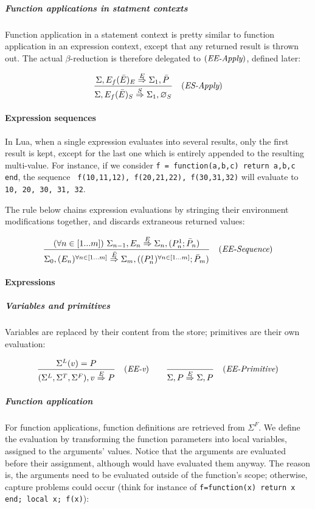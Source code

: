 \subparagraph{Function applications in statment contexts}
Function application in a statement context is pretty similar to
function application in an expression context, except that any
returned result is thrown out.  The actual
$\beta$-reduction is therefore delegated to $(\textit{EE-Apply})$,
defined later:

$$ \frac{
  \Sigma, E_f(\bar E)_E \stackrel{E}{\Rightarrow} \Sigma_1, \bar P\\
  }
  {\Sigma, E_f(\bar E)_S \stackrel{S}{\Rightarrow} \Sigma_1, \varnothing_S}
  \quad
  (\textit{ES-Apply})$$

\paragraph{Expression sequences}
In Lua, when a single expression evaluates into several results, only
the first result is kept, except for the last one which is entirely
appended to the resulting multi-value.  For instance, if we consider
{\tt f = function(a,b,c) return a,b,c end}, the sequence {\tt
  f(10,11,12), f(20,21,22), f(30,31,32)} will evaluate to {\tt 10, 20,
  30, 31, 32}.

The rule below chains expression evaluations by stringing their
environment modifications together, and discards extraneous returned values:

$$\frac{
  (\forall n \in [1...m])\ 
  \Sigma_{n-1}, E_n \evalstoE \Sigma_n, (P_n^1;\bar P_n)
} {
  \Sigma_0, (E_n)^{\forall n\in [1...m]} \evalstoEbar \Sigma_m,
  ((P_n^1)^{\forall n\in[1...m]}; \bar P_m)
}
\quad\eqlabel{EE-Sequence}$$

\paragraph{Expressions}

\subparagraph{Variables and primitives}
Variables are replaced by their content from the store; primitives are
their own evaluation:

$$ \frac{
\Sigma^L(v) = P
}{
(\Sigma^L,\Sigma^T,\Sigma^F), v \stackrel{E}{\Rightarrow} P
}\quad(\textit{EE-v})
\qquad
\frac{}{
\Sigma, P \stackrel{E}{\Rightarrow} \Sigma, P
}\quad(\textit{EE-Primitive})$$

\subparagraph{Function application}
For function applications, function definitions are retrieved from
$\Sigma^F$. We define the evaluation by transforming the function
parameters into local variables, assigned to the arguments' values.
Notice that the arguments are evaluated before their assignment,
although \eqlabel{EE-Assign} would have evaluated them anyway. The
reason is, the arguments need to be evaluated outside of the
function's scope; otherwise, capture problems could occur (think for
instance of {\tt f=function(x) return x end; local x; f(x)}):


